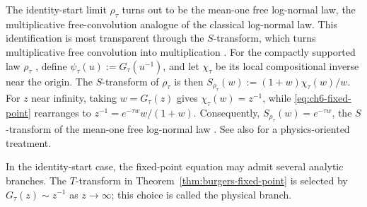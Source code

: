 \begin{remark}
\label{rem:free-lognormal}
The identity-start limit $\rho_\tau$ turns out to be the mean-one free log-normal law, the multiplicative free-convolution analogue of the classical log-normal law. This identification is most transparent through the $S$-transform, which turns multiplicative free convolution into multiplication \cite{bercovici1992levy}. For the compactly supported law $\rho_\tau$ \cite[Corollary 4.1]{li2026geometric}, define $\psi_\tau(u) := G_\tau(u^{-1})$, and let $\chi_\tau$ be its local compositional inverse near the origin. The $S$-transform of $\rho_\tau$ is then $S_{\rho_\tau}(w) := (1 + w)\chi_\tau(w)/w$. For $z$ near infinity, taking $w = G_\tau(z)$ gives $\chi_\tau(w) = z^{-1}$, while \eqref{eq:ch6-fixed-point} rearranges to $z^{-1} = e^{-\tau w} w / (1 + w)$. Consequently, $S_{\rho_\tau}(w) = e^{-\tau w}$, the $S$-transform of the mean-one free log-normal law \cite[Corollary 1.3 and Section 4]{li2026geometric}. See also \cite[Section 16.3]{potters2020first} for a physics-oriented treatment.
\end{remark}

\begin{remark}
\label{rem:physical-branch}
In the identity-start case, the fixed-point equation may admit several analytic branches. The $T$-transform in Theorem~\ref{thm:burgers-fixed-point} is selected by $G_\tau(z) \sim z^{-1}$ as $z \to \infty$; this choice is called the physical branch.
\end{remark}

